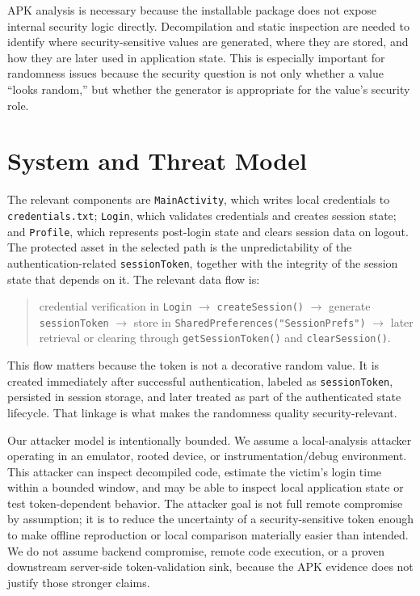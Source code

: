 \documentclass[letterpaper,twocolumn,10pt]{article}
\begin{document}
APK analysis is necessary because the installable package does not expose internal security logic directly. Decompilation and static inspection are needed to identify where security-sensitive values are generated, where they are stored, and how they are later used in application state. This is especially important for randomness issues because the security question is not only whether a value ``looks random,'' but whether the generator is appropriate for the value's security role.

\section{System and Threat Model}
The relevant components are \texttt{MainActivity}, which writes local credentials to \texttt{credentials.txt}; \texttt{Login}, which validates credentials and creates session state; and \texttt{Profile}, which represents post-login state and clears session data on logout. The protected asset in the selected path is the unpredictability of the authentication-related \texttt{sessionToken}, together with the integrity of the session state that depends on it. The relevant data flow is:

\begin{quote}
credential verification in \texttt{Login} $\rightarrow$ \texttt{createSession()} $\rightarrow$ generate \texttt{sessionToken} $\rightarrow$ store in \texttt{SharedPreferences("SessionPrefs")} $\rightarrow$ later retrieval or clearing through \texttt{getSessionToken()} and \texttt{clearSession()}.
\end{quote}

This flow matters because the token is not a decorative random value. It is created immediately after successful authentication, labeled as \texttt{sessionToken}, persisted in session storage, and later treated as part of the authenticated state lifecycle. That linkage is what makes the randomness quality security-relevant.

Our attacker model is intentionally bounded. We assume a local-analysis attacker operating in an emulator, rooted device, or instrumentation/debug environment. This attacker can inspect decompiled code, estimate the victim's login time within a bounded window, and may be able to inspect local application state or test token-dependent behavior. The attacker goal is not full remote compromise by assumption; it is to reduce the uncertainty of a security-sensitive token enough to make offline reproduction or local comparison materially easier than intended. We do not assume backend compromise, remote code execution, or a proven downstream server-side token-validation sink, because the APK evidence does not justify those stronger claims.
\end{document}
